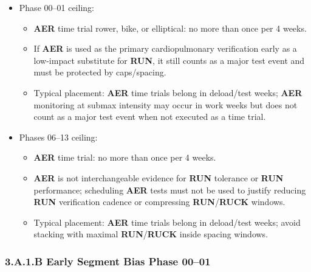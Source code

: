 \documentclass[10pt]{article}
\begin{document}
\begin{enumerate}
\begin{itemize}
\item Phase 00–01 ceiling:
  \begin{itemize}
  \item \textbf{AER} time trial rower, bike, or elliptical: no more than once per 4 weeks.
  \item If \textbf{AER} is used as the primary cardiopulmonary verification early as a low-impact substitute for \textbf{RUN}, it still counts as a major test event and must be protected by caps/spacing.
  \item Typical placement: \textbf{AER} time trials belong in deload/test weeks; \textbf{AER} monitoring at submax intensity may occur in work weeks but does not count as a major test event when not executed as a time trial.
  \end{itemize}
\item Phases 06–13 ceiling:
  \begin{itemize}
  \item \textbf{AER} time trial: no more than once per 4 weeks.
  \item \textbf{AER} is not interchangeable evidence for \textbf{RUN} tolerance or \textbf{RUN} performance; scheduling \textbf{AER} tests must not be used to justify reducing \textbf{RUN} verification cadence or compressing \textbf{RUN}/\textbf{RUCK} windows.
  \item Typical placement: \textbf{AER} time trials belong in deload/test weeks; avoid stacking with maximal \textbf{RUN}/\textbf{RUCK} inside spacing windows.
  \end{itemize}
\end{itemize}

\end{enumerate}

\subsubsection*{3.A.1.B Early Segment Bias Phase 00–01}
\end{document}
